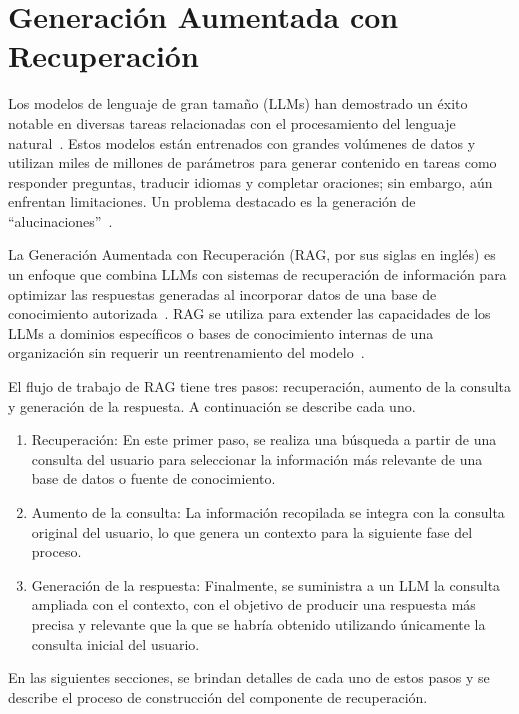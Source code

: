 \chapter{Generación Aumentada con Recuperación}\label{chapter:rag}

Los modelos de lenguaje de gran tamaño (LLMs) han demostrado un éxito notable en diversas tareas relacionadas con el procesamiento del lenguaje natural~\cite{makridakis2023largelanguagemodels}. Estos modelos están entrenados con grandes volúmenes de datos y utilizan miles de millones de parámetros para generar contenido en tareas como responder preguntas, traducir idiomas y completar oraciones; sin embargo, aún enfrentan limitaciones. Un problema destacado es la generación de ``alucinaciones''~\cite{zhang2023sirenssongaiocean}.

La Generación Aumentada con Recuperación (RAG, por sus siglas en inglés) es un enfoque que combina LLMs con sistemas de recuperación de información para optimizar las respuestas generadas al incorporar datos de una base de conocimiento autorizada~\cite{gao2024retrievalaugmentedgenerationlargelanguage}. RAG se utiliza para extender las capacidades de los LLMs a dominios específicos o bases de conocimiento internas de una organización sin requerir un reentrenamiento del modelo~\cite{gao2024retrievalaugmentedgenerationlargelanguage}.

El flujo de trabajo de RAG tiene tres pasos: recuperación, aumento de la consulta y generación de la respuesta. A continuación se describe cada uno.
\begin{enumerate}
     \item Recuperación: En este primer paso, se realiza una búsqueda a partir de una consulta del usuario para seleccionar la información más relevante de una base de datos o fuente de conocimiento.
    \item Aumento de la consulta: La información recopilada se integra con la consulta original del usuario, lo que genera un contexto para la siguiente fase del proceso.
    \item Generación de la respuesta: Finalmente, se suministra a un LLM la consulta ampliada con el contexto, con el objetivo de producir una respuesta más precisa y relevante que la que se habría obtenido utilizando únicamente la consulta inicial del usuario.
\end{enumerate}

En las siguientes secciones, se brindan detalles de cada uno de estos pasos y se describe el proceso de construcción del componente de recuperación. 

